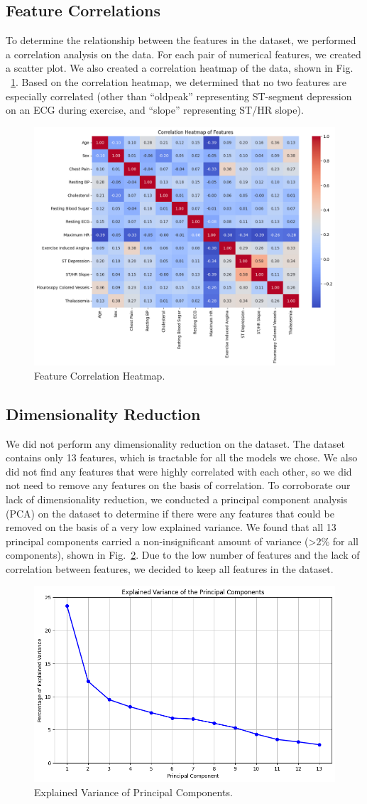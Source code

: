 \subsection{Feature Correlations}
To determine the relationship between the features in the dataset, we performed a correlation analysis on the data. For each pair of numerical features, we created a scatter plot. We also created a correlation heatmap of the data, shown in Fig. ~\ref{featureheatmap}. Based on the correlation heatmap, we determined that no two features are especially correlated (other than ``oldpeak'' representing ST-segment depression on an ECG during exercise, and ``slope'' representing ST/HR slope).

\begin{figure}[htbp]
    \centerline{\includegraphics[width=0.7\columnwidth]{img/featureheatmap.png}}
    \caption{Feature Correlation Heatmap.}\label{featureheatmap}
\end{figure}

\subsection{Dimensionality Reduction}
We did not perform any dimensionality reduction on the dataset. The dataset contains only 13 features, which is tractable for all the models we chose. We also did not find any features that were highly correlated with each other, so we did not need to remove any features on the basis of correlation. To corroborate our lack of dimensionality reduction, we conducted a principal component analysis (PCA) on the dataset to determine if there were any features that could be removed on the basis of a very low explained variance. We found that all 13 principal components carried a non-insignificant amount of variance (>2\% for all components), shown in Fig.~\ref{pca}. Due to the low number of features and the lack of correlation between features, we decided to keep all features in the dataset.

\begin{figure}[htbp]
    \centerline{\includegraphics[width=0.7\columnwidth]{img/pca.png}}
    \caption{Explained Variance of Principal Components.}\label{pca}
\end{figure}